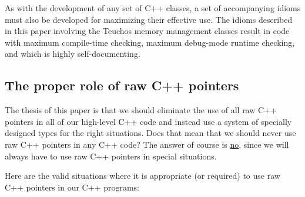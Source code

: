 \documentclass[pdf,ps2pdf,11pt]{SANDreport}
\begin{document}
As with the development of any set of C++ classes, a set of
accompanying idioms must also be developed for maximizing their
effective use.  The idioms described in this paper involving the
Teuchos memory management classes result in code with maximum
compile-time checking, maximum debug-mode runtime checking, and which
is highly self-documenting.


%
{}\subsection{The proper role of raw C++ pointers}
\label{sec:role-of-raw-pointers}
%

The thesis of this paper is that we should eliminate the use of all
raw C++ pointers in all of our high-level C++ code and instead use a
system of specially designed types for the right situations.  Does
that mean that we should never use raw C++ pointers in any C++ code?
The answer of course is {}\underline{no}, since we will always have to
use raw C++ pointers in special situations.

Here are the valid situations where it is appropriate (or required)
to use raw C++ pointers in our C++ programs:
\end{document}

